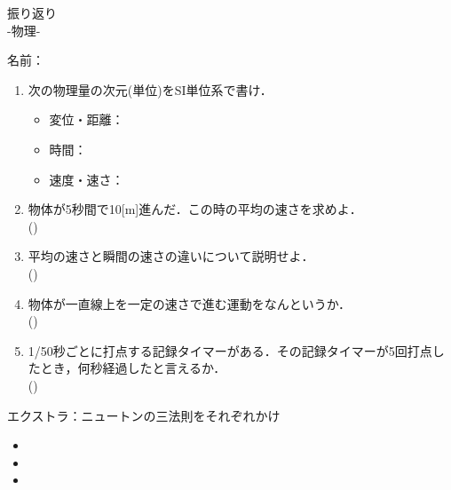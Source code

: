 \documentclass[fontsize=15pt]{jlreq}
\newcommand{\m}[1]{\raisebox{0.1em}{\textcircled{\scriptsize #1}}}
\begin{document}
\begin{center}
{\LARGE {振り返り}} \\
-物理\m{1}- %
\end{center}
\vspace{1em}
\begin{flushright}
名前：\underline{\hspace{5cm}}
\end{flushright}

\begin{enumerate}
    \item 次の物理量の次元(単位)をSI単位系で書け．\\
    \begin{itemize}
        \item 変位・距離：
        \item 時間：
        \item 速度・速さ：
    \end{itemize}
    \vspace{2em} 

    \item 物体が5秒間で10[m]進んだ．この時の平均の速さを求めよ．\\
    (\hspace{4cm})
    \vspace{2em} 

    \item 平均の速さと瞬間の速さの違いについて説明せよ．\\
    (\hspace{15cm})
    
    \vspace{2em} 

    \item 物体が一直線上を一定の速さで進む運動をなんというか．\\
    (\hspace{4cm})
    \vspace{2em} 

    \item 1/50秒ごとに打点する記録タイマーがある．その記録タイマーが5回打点したとき，何秒経過したと言えるか．\\
    (\hspace{4cm})
    \vspace{2em}  

\end{enumerate}

エクストラ：ニュートンの三法則をそれぞれかけ
\begin{itemize}
    \item \m{1}
    \item \m{2}
    \item \m{3}
\end{itemize}
\end{document}
